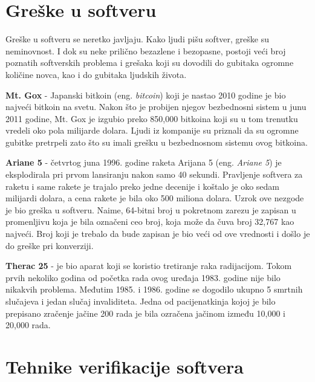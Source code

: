\documentclass[12pt,oneside]{memoir}
\begin{document}
\section{Greške u softveru} \label{sct:greske}
Greške u softveru se neretko javljaju. Kako ljudi pišu softver, greške su neminovnost. I dok su neke prilično bezazlene i bezopasne, postoji veći broj poznatih softverskih problema i grešaka koji su dovodili do gubitaka ogromne količine novca, kao i do gubitaka ljudskih života.

\begin{description}

    \item \textbf{Mt. Gox} \cite{software_erros} - Japanski bitkoin (eng. \textit{bitcoin}) koji je nastao 2010 godine je bio najveći bitkoin na svetu. Nakon što je probijen njegov bezbednosni sistem u junu 2011 godine, Mt. Gox je izgubio preko 850,000 bitkoina koji su u tom trenutku vredeli oko pola milijarde dolara. Ljudi iz kompanije su priznali da su ogromne gubitke pretrpeli zato što su imali grešku u bezbednosnom sistemu ovog bitkoina.
    
    \item \textbf{Ariane 5} \cite{arriane_5} - četvrtog juna 1996. godine raketa Arijana 5 (eng. \textit{Ariane 5}) je eksplodirala pri prvom lansiranju nakon samo 40 sekundi. Pravljenje softvera za raketu i same rakete je trajalo preko jedne decenije i koštalo je oko sedam milijardi dolara, a cena rakete je bila oko 500 miliona dolara. Uzrok ove nezgode je bio greška u softveru. Naime, 64-bitni broj u pokretnom zarezu je zapisan u promenljivu koja je bila označeni ceo broj, koja može da čuva broj 32,767 kao najveći. Broj koji je trebalo da bude zapisan je bio veći od ove vrednosti i došlo je do greške pri konverziji.
    
    \item \textbf{Therac 25} \cite{therac_25} - je bio aparat koji se koristio tretiranje raka radijacijom. Tokom prvih nekoliko godina od početka rada ovog uređaja 1983. godine nije bilo nikakvih problema. Međutim 1985. i 1986. godine se dogodilo ukupno 5 smrtnih slučajeva i jedan slučaj invaliditeta. Jedna od pacijenatkinja kojoj je bilo prepisano zračenje jačine 200 rada je bila ozračena jačinom između 10,000 i 20,000 rada.  

\end{description}

\section{Tehnike verifikacije softvera} \label{sct:tehnike}
\end{document}
